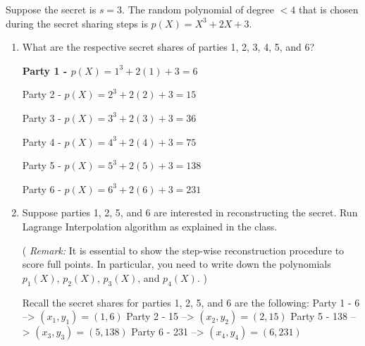 \documentclass[11pt]{article}
\begin{document}
\begin{enumerate}
  Suppose the secret is $s=3$. 
  The random polynomial of degree $<4$ that is chosen during the secret sharing steps is $p(X) = X^3+ 2X + 3$. 
  \begin{enumerate}
  \item What are the respective secret shares of parties 1, 2, 3, 4, 5, and 6? \newline 
    {\bfseries
    \newline
    \newline
      Party 1 - $p(X) = 1^3 + 2(1) + 3 = 6$

      Party 2 - $p(X) = 2^3 + 2(2) + 3 = 15$

      Party 3 - $p(X) = 3^3 + 2(3) + 3 = 36$

      Party 4 - $p(X) = 4^3 + 2(4) + 3 = 75$

      Party 5 - $p(X) = 5^3 + 2(5) + 3 = 138$

      Party 6 - $p(X) = 6^3 + 2(6) + 3 = 231$
    }
     \newpage
  \item Suppose parties 1, 2, 5, and 6 are interested in reconstructing the secret. 
    Run Lagrange Interpolation algorithm as explained in the class. 
    
    ({\footnotesize {\em 
      Remark:} 
      It is essential to show the step-wise reconstruction procedure to score full points. 
      In particular, you need to write down the polynomials $p_1(X)$, $p_2(X)$, $p_3(X)$, and $p_4(X)$.%
    })\newline 
    {\bfseries
      \newline
      \newline

      Recall the secret shares for parties 1, 2, 5, and 6 are the following: \newline
      Party 1 - 6  --> $(x_1,y_1) = (1,6)$ \newline
      Party 2 - 15  --> $(x_2,y_2) = (2,15)$ \newline
      Party 5 - 138  --> $(x_3,y_3) = (5,138)$ \newline
      Party 6 - 231  --> $(x_4,y_4) = (6,231)$ \newline

}
\end{enumerate}
\end{enumerate}
\end{document}
